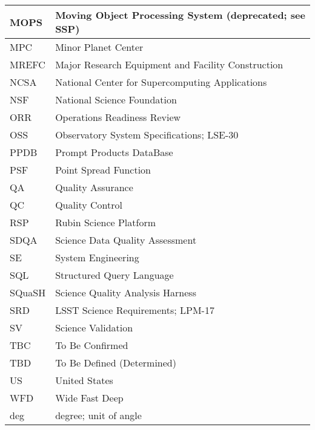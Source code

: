 \begin{longtable}{p{}p{}}
MOPS & Moving Object Processing System (deprecated; see SSP) \\\hline
MPC & Minor Planet Center \\\hline
MREFC & Major Research Equipment and Facility Construction \\\hline
NCSA & National Center for Supercomputing Applications \\\hline
NSF & National Science Foundation \\\hline
ORR & Operations Readiness Review \\\hline
OSS & Observatory System Specifications; LSE-30 \\\hline
PPDB & Prompt Products DataBase \\\hline
PSF & Point Spread Function \\\hline
QA & Quality Assurance \\\hline
QC & Quality Control \\\hline
RSP & Rubin Science Platform \\\hline
SDQA & Science Data Quality Assessment \\\hline
SE & System Engineering \\\hline
SQL & Structured Query Language \\\hline
SQuaSH & Science Quality Analysis Harness \\\hline
SRD & LSST Science Requirements; LPM-17 \\\hline
SV & Science Validation \\\hline
TBC & To Be Confirmed \\\hline
TBD & To Be Defined (Determined) \\\hline
US & United States \\\hline
WFD & Wide Fast Deep \\\hline
deg & degree; unit of angle \\\hline
\end{longtable}
